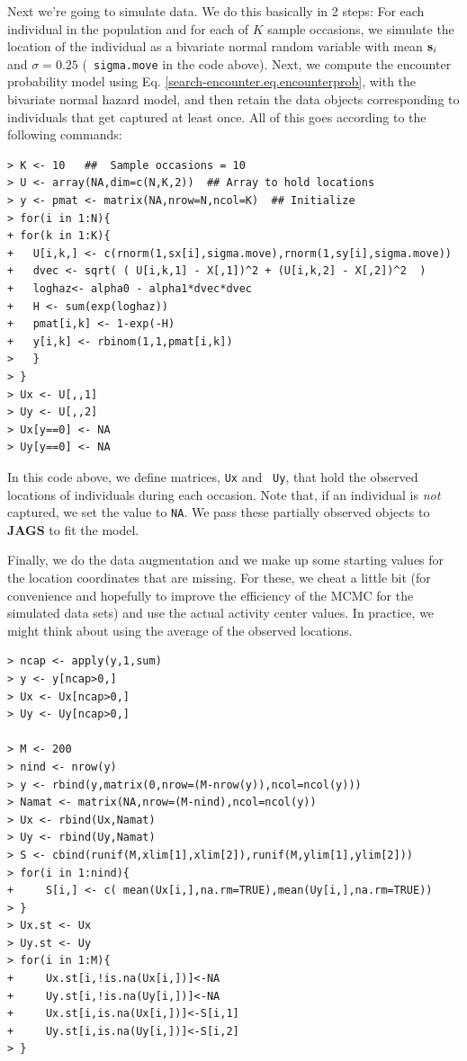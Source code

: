 Next we're going to simulate data. We do this basically in 2 steps:
For each individual in the population and for each of $K$ sample
occasions, we simulate the location of the individual as a bivariate
normal random variable with mean ${\bf s}_i$ and $\sigma = 0.25$ ({\tt
  sigma.move} in the code above). Next, we compute the encounter
probability model using Eq. \ref{search-encounter.eq.encounterprob},
with the bivariate normal hazard model, and then retain the data
objects corresponding to individuals that get captured at least
once. All of this goes according to the following commands: 
{\small
\begin{verbatim}
> K <- 10   ##  Sample occasions = 10
> U <- array(NA,dim=c(N,K,2))  ## Array to hold locations
> y <- pmat <- matrix(NA,nrow=N,ncol=K)  ## Initialize
> for(i in 1:N){
+ for(k in 1:K){
+   U[i,k,] <- c(rnorm(1,sx[i],sigma.move),rnorm(1,sy[i],sigma.move))
+   dvec <- sqrt( ( U[i,k,1] - X[,1])^2 + (U[i,k,2] - X[,2])^2  )
+   loghaz<- alpha0 - alpha1*dvec*dvec   
+   H <- sum(exp(loghaz))
+   pmat[i,k] <- 1-exp(-H)
+   y[i,k] <- rbinom(1,1,pmat[i,k])
>   }
> }
> Ux <- U[,,1]
> Uy <- U[,,2]
> Ux[y==0] <- NA
> Uy[y==0] <- NA
\end{verbatim}
}

In this code above, we define matrices, \mbox{\tt Ux} and \mbox{\tt
  Uy}, that hold the observed locations of individuals during each
occasion. Note that, if an individual is {\it not} captured, we set
the value to \mbox{\tt NA}. We pass these partially observed objects
to {\bf JAGS} to fit the model.

Finally, we do the data augmentation and we make up some starting
values for the location coordinates that are missing. 
 For these, we
cheat a little bit (for convenience and hopefully to improve the
efficiency of the MCMC for the simulated data sets) and use the actual
activity center values. In practice, we might think about using the
average of the observed locations.
{\small
\begin{verbatim}
> ncap <- apply(y,1,sum)
> y <- y[ncap>0,]
> Ux <- Ux[ncap>0,]
> Uy <- Uy[ncap>0,]

> M <- 200
> nind <- nrow(y)
> y <- rbind(y,matrix(0,nrow=(M-nrow(y)),ncol=ncol(y)))
> Namat <- matrix(NA,nrow=(M-nind),ncol=ncol(y))
> Ux <- rbind(Ux,Namat)
> Uy <- rbind(Uy,Namat)
> S <- cbind(runif(M,xlim[1],xlim[2]),runif(M,ylim[1],ylim[2]))
> for(i in 1:nind){
+     S[i,] <- c( mean(Ux[i,],na.rm=TRUE),mean(Uy[i,],na.rm=TRUE))
> }
> Ux.st <- Ux
> Uy.st <- Uy
> for(i in 1:M){
+     Ux.st[i,!is.na(Ux[i,])]<-NA
+     Uy.st[i,!is.na(Uy[i,])]<-NA
+     Ux.st[i,is.na(Ux[i,])]<-S[i,1]
+     Uy.st[i,is.na(Uy[i,])]<-S[i,2]
> }
\end{verbatim}
}


